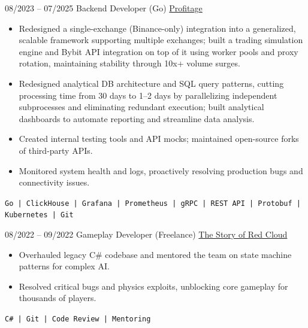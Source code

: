 \documentclass[9pt]{developercv} %
\begin{document}
\vspace{-10 pt}
\begin{entrylist}
	\entry
        {08/2023 -- 07/2025}
		{Backend Developer (Go)}
		{\href{https://profitage.com}{Profitage}}
		{\vspace{-10pt}
        \begin{itemize}[noitemsep,topsep=0pt,parsep=0pt,partopsep=0pt, leftmargin=-1pt]
            \item Redesigned a single-exchange (Binance-only) integration into a generalized, scalable framework supporting multiple exchanges; built a trading simulation engine and Bybit API integration on top of it using worker pools and proxy rotation, maintaining stability through 10x+ volume surges. 
            \item Redesigned analytical DB architecture and SQL query patterns, cutting processing time from 30 days to 1–2 days by parallelizing independent subprocesses and eliminating redundant execution; built analytical dashboards to automate reporting and streamline data analysis. 
            \item Created internal testing tools and API mocks; maintained open-source forks of third-party APIs. 
            \item Monitored system health and logs, proactively resolving production bugs and connectivity issues.
        \end{itemize} 
        \texttt{Go | ClickHouse | Grafana | Prometheus | gRPC | REST API | Protobuf | Kubernetes | Git}}
	\entry
		{08/2022 -- 09/2022}
		{Gameplay Developer (Freelance)}
		{\href{https://steamcommunity.com/sharedfiles/filedetails/?id=2824879484}{The Story of Red Cloud}}
		{\vspace{-10pt}
        \begin{itemize}[noitemsep,topsep=0pt,parsep=0pt,partopsep=0pt, leftmargin=-1pt]
            \item Overhauled legacy C\# codebase and mentored the team on state machine patterns for complex AI.
            \item Resolved critical bugs and physics exploits, unblocking core gameplay for thousands of players.
        \end{itemize} 
        \texttt{C\# | Git | Code Review | Mentoring}}
\end{entrylist}
\end{document}
